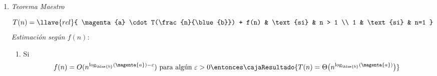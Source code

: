 \begin{enumerate}[label=\tiny\purple{\faIcon{snowman}}]
        \textit{Caso con $d = 1$}: Costo de dividir y combinar un problema es lineal, $b \cdot n$:
        $$
          \textstyle
          b \cdot n^1 = b \cdot n
          \entonces
          T(n) \leq
          b \cdot n \sumatoria{i = 0}{\log_{\blue{b}}(n)} (\frac{\magenta{a}}{\blue{b}})^i
        $$
        Esa sumatoria es convergente para $\frac{\magenta{a}}{\blue{b}} < 1$:
        $$
          T(n) = O(n)
        $$
        Si $\frac{\magenta{a}}{\blue{b}} > 1$ uso la expresión para la serie geométrica:
        $$
          \textstyle
          T(n) \leq bn \frac{(\frac{\magenta{a}}{\blue{b}})^{\scriptscriptstyle \log_{\blue{b}}(n + 1)} - 1}{\frac{\magenta{a}}{\blue{b}} - 1}
          =
          O\big(
          n \cdot (\frac{\magenta{a}}{\blue{b}})^{\log_{\blue{b}}n}
          \big)
          \igual{\red{!!}}
          O\big(
          \magenta{a}^{\log_{\blue{b}}n}
          \big)
          \igual{\red{!!}}
          O\Big(
          \magenta{a}^{
            \frac{\log_{\magenta{a}}(n)}{\log_{\magenta{a}}(\blue{b})}
          }
          \Big)
          \igual{\red{!!}}
          O\Big(
          n^{
            \frac{1}{\log_{\magenta{a}}(\blue{b})}
          }
          \Big)
          \igual{\red{!!}}
          O\big(
          n^{
            \log_{\blue{b}}(\magenta{a})
          }
          \big)
        $$
        Todos los pasos \red{!!} son propiedades y cambios de base de logaritmos.
        $$
          T(n) =
          O\big(
          n^{
            \log_{\blue{b}}(\magenta{a})
          }
          \big)
        $$

  \item \hypertarget{teoria-1:teorema-maestro}{\textit{Teorema Maestro}}
        $$
          T(n) =
          \llave{rcl}{
            \magenta{a} \cdot T(\frac{n}{\blue{b}}) + f(n) & \text{si} & n > 1 \\
            1 & \text{si} & n=1
          }
        $$
        \textit{Estimación según $f(n)$}:
        \begin{enumerate}[label=\faIcon{gamepad}$_{\arabic*}$]
          \item
                Si
                $$
                  \begin{array}{c}
                    f(n) = O(n^{\log_{\blue{b}}(\magenta{a}) - \varepsilon})
                    \text{ para algún }
                    \varepsilon > 0
                    \entonces
                    \cajaResultado{
                      T(n) = \Theta
                      \big(
                      n^{\log_{\blue{b}}(\magenta{a})}
                      \big)
                    }
                  \end{array}
                $$


\end{enumerate}
\end{enumerate}

